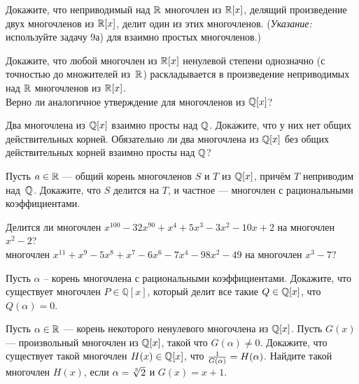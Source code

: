 \documentclass[a4paper,11pt]{article}
\begin{document}


 Докажите, что неприводимый над $\mathbb{R}$ многочлен из $\mathbb{R}[x]$, делящий произведение двух
многочленов  из $\mathbb{R}[x]$, делит один из этих многочленов. {\small ({\em Указание:}\/ используйте задачу 9а) для взаимно простых многочленов.)}

  Докажите, что любой многочлен из $\mathbb{R}[x]$ ненулевой степени
однозначно (с точностью до множителей из~$\mathbb{R}$)
раскладывается в произведение неприводимых над  $\mathbb{R}$ многочленов
из $\mathbb{R}[x]$.\\  Верно ли аналогичное утверждение для многочленов из $\mathbb{Q}[x]$?


Два многочлена из $\mathbb{Q}[x]$ взаимно просты над $\mathbb{Q}$. Докажите, что у них нет общих действительных корней. 
 Обязательно ли два многочлена из $\mathbb{Q}[x]$ без общих действительных корней взаимно просты над $\mathbb{Q}$?

Пусть $a\in\mathbb{R}$ --- общий корень многочленов $S$ и $T$ из $\mathbb{Q}[x]$,
причём $T$ неприводим над~$\mathbb{Q}$. Докажите,
что $S$ делится на $T$, и частное --- многочлен с рациональными
коэффициентами.


Делится ли
многочлен $x^{100}-32x^{90}+x^4+5x^3-3x^2-10x+2$
на многочлен $x^2-2$?\\
многочлен $x^{11}+x^{9}-5x^{8}+x^7-6x^{6}-7x^4-98x^2-49$
на многочлен $x^3-7$?


Пусть $\alpha$ -- корень многочлена с рациональными коэффициентами. Докажите, что существует многочлен $P \in \mathbb{Q}[x]$, который делит все такие $Q\in\mathbb{Q}[x]$, что $Q(\alpha)=0$.


Пусть  $\alpha\in\mathbb{R}$ --- корень некоторого ненулевого
многочлена из $\mathbb{Q}[x]$.
Пусть $G(x)$ --- произвольный многочлен из $\mathbb{Q}[x]$, такой что
$G(\alpha)\ne0.$
Докажите, что  существует такой многочлен $H(x)\in\mathbb{Q}[x]$, что
${1\over{G(\alpha)}}=H(\alpha)$.
Найдите такой многочлен $H(x)$, если $\alpha=\root 3\of 2$ и $G(x)=x+1$.



\end{document}
